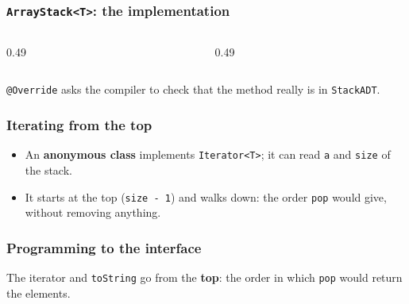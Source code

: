 \documentclass[aspectratio=169,10pt,compress]{beamer}
\begin{document}
\begin{frame}[t,fragile] \frametitle{\texttt{ArrayStack<T>}: the implementation}
  \begin{columns}[T]
    \begin{column}{0.49\textwidth}
    \end{column}
    \begin{column}{0.49\textwidth}
    \end{column}
  \end{columns}
  \small \texttt{@Override} asks the compiler to check that the method really is in \texttt{StackADT}.
\end{frame}




\begin{frame}[t,fragile] \frametitle{Iterating from the top}
  \begin{itemize}\small
    \item An \textbf{anonymous class} implements \texttt{Iterator<T>}; it can read \texttt{a} and \texttt{size} of the stack.
    \item It starts at the top (\texttt{size - 1}) and walks down: the order \texttt{pop} would give, without removing anything.
  \end{itemize}
\end{frame}




\begin{frame}[t,fragile] \frametitle{Programming to the interface}

  \vspace{0.2em}
  \small The iterator and \texttt{toString} go from the \textbf{top}: the order in which \texttt{pop} would return the elements.
\end{frame}
\end{document}
